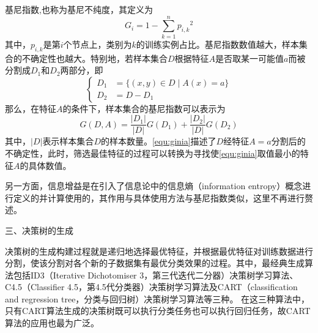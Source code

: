 基尼指数,也称为基尼不纯度，其定义为
\begin{equation}
    \label{equ:gini}
    G_i = 1 - \sum_{k=1}^n{p_{i,k}}^2
\end{equation}
其中，$p_{i,k}$是第$i$个节点上，类别为$k$的训练实例占比。基尼指数数值越大，样本集合的不确定性也越大。特别地，若样本集合$D$根据特征$A$是否取某一可能值$a$而被分割成$D_1$和$D_2$两部分，即
\begin{equation}
    \label{equ:daset}
    \left \{
    \begin{aligned}
        D_1 &= \{ (x,y) \in D \mid A(x) = a\} \\
        D_2 &= D - D_1
    \end{aligned}
    \right.
\end{equation}
那么，在特征$A$的条件下，样本集合的基尼指数可以表示为
\begin{equation}
    \label{equ:ginia}
    G(D,A) = \frac{|D_1|}{|D|}G(D_1) + \frac{|D_2|}{|D|}G(D_2)
\end{equation}
其中，$|D|$表示样本集合$D$的样本数量。\autoref{equ:ginia}描述了$D$经特征$A=a$分割后的不确定性，此时，筛选最佳特征的过程可以转换为寻找使\autoref{equ:ginia}取值最小的特征$A$的具体数值。

另一方面，信息增益是在引入了信息论中的信息熵（information entropy）概念进行定义的并计算使用的，其作用与具体使用方法与基尼指数类似，这里不再进行赘述\cite{Zhou2016,Li2017}。

三、决策树的生成

决策树的生成构建过程就是递归地选择最优特征，并根据最优特征对训练数据进行分割，使该分割对各个新的子数据集有最优分类效果的过程。其中，最经典生成算法包括ID3（Iterative Dichotomiser 3，第三代迭代二分器）决策树学习算法、
C4.5（Classifier 4.5，第4.5代分类器）决策树学习算法及CART（classification and regression tree，分类与回归树）决策树学习算法等三种\cite{quinlan1986,quinlan1993,breiman1984}。
在这三种算法中，只有CART算法生成的决策树既可以执行分类任务也可以执行回归任务，故CART算法的应用也最为广泛。

